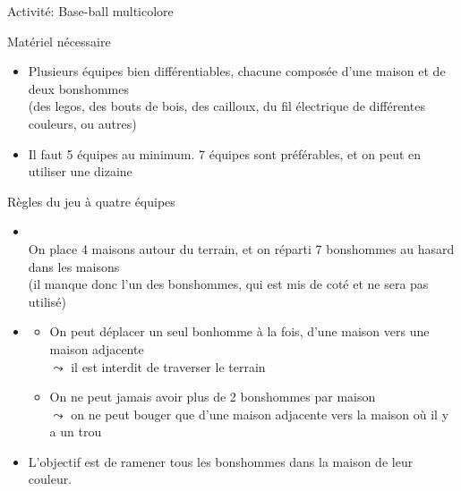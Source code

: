 \documentclass[final,hyperref={pdfpagelabels=false}]{beamer}
\renewenvironment{Coupe}{   }{   }
\renewcommand*{\normalsize}{\fontsize{\resultnormalsizeX}{\resultnormalsizeY}\selectfont}
\begin{document}
\begin{Coupe}
\newcommand{\maisonQuatre}[2]{\maisonPair{#1}{#2}{4}{12}{1/A,2/B,3/C,4/D}}
\newcommand{\maisonCinq}[2]{\maisonImpair{#1}{#2}{5}{20}{1/A,2/B,3/C,4/D,5/E}}
\newcommand{\maisonSix}[2]{\maisonPair{#1}{#2}{6}{24}{1/A,2/B,3/C,4/D,5/E,6/F}}
\newcommand{\maisonSept}[2]{\maisonImpair{#1}{#2}{7}{28}{1/A,2/B,3/C,4/D,5/E,6/F,7/G}}


\newcommand{\pawn}[1]{\tikz \draw node[shape=circle,fill=#1,draw=black,inner sep=.1] {~~~};}


\begin{frame}{Activité: Base-ball multicolore}
  \begin{block}{Matériel nécessaire}
    \begin{itemize}
    \item Plusieurs équipes bien différentiables, chacune composée d'une maison
      et de deux bonshommes\\
      (des legos, des bouts de bois, des cailloux, du fil électrique de
      différentes couleurs, ou autres)

    \item Il faut 5 équipes au minimum. 7 équipes sont préférables, et on peut
      en utiliser une dizaine
    \end{itemize}
  \end{block}

  \begin{block}{Règles du jeu à quatre équipes}
    \begin{itemize}
    \item {}~\\
      On place 4 maisons autour du terrain, et on réparti 7 bonshommes au
      hasard dans les maisons\\
     (il manque donc l'un des bonshommes, qui est mis de coté et ne sera
      pas utilisé)
    \item {}
      \begin{itemize}\normalsize
      \item On peut déplacer un seul bonhomme à la fois, d'une maison vers une
        maison adjacente\\
        $\leadsto$ il est interdit de traverser le terrain
      \item On ne peut jamais avoir plus de 2 bonshommes par maison\\
        $\leadsto$ on ne peut bouger que d'une maison adjacente vers la maison
        où il y a un trou
      \end{itemize}
    \item  {}
      L'objectif est de ramener tous les bonshommes dans la maison de leur couleur.
    \end{itemize}
  \end{block}


\end{frame}
\end{Coupe}
\end{document}
